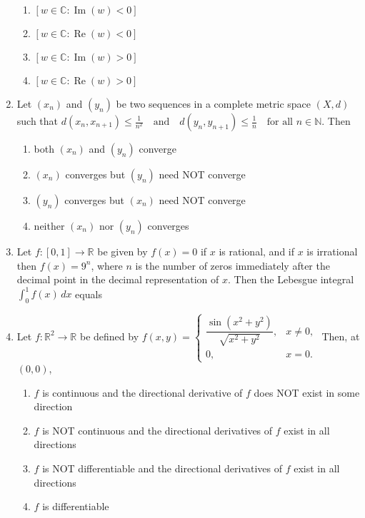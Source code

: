 \documentclass{article}
\newcommand{\brak}[1]{\left( #1 \right)}
\newcommand{\sbrak}[1]{\left[ #1 \right]}
\begin{document}
\begin{enumerate}
\begin{enumerate}
    \item $\sbrak{w \in \mathbb{C} : \operatorname{Im} \brak{w} < 0}$
    \item $\sbrak{w \in \mathbb{C} : \operatorname{Re} \brak{w} < 0}$
    \item $\sbrak{w \in \mathbb{C} : \operatorname{Im} \brak{w} > 0}$
    \item $\sbrak{w \in \mathbb{C} : \operatorname{Re} \brak{w} > 0}$
\end{enumerate}

\item Let $\brak{x_n}$ and $\brak{y_n}$ be two sequences in a complete metric space $\brak{X, d}$ such that 
$d \brak{x_n, x_{n+1}} \leq \frac{1}{n^2} \quad \text{and} \quad d \brak{y_n, y_{n+1}} \leq \frac{1}{n} \quad \text{for all } n \in \mathbb{N}.$
Then

\begin{enumerate}
    \item both $\brak{x_n}$ and $\brak{y_n}$ converge
    \item $\brak{x_n}$ converges but $\brak{y_n}$ need NOT converge
    \item $\brak{y_n}$ converges but $\brak{x_n}$ need NOT converge
    \item neither $\brak{x_n}$ nor $\brak{y_n}$ converges
\end{enumerate}

\item Let $f: \sbrak{0, 1} \to \mathbb{R}$ be given by $f \brak{x} = 0$ if $x$ is rational, and if $x$ is irrational then $f \brak{x} = 9^n$, where $n$ is the number of zeros immediately after the decimal point in the decimal representation of $x$. Then the Lebesgue integral
$\int_0^1 f \brak{x} \, dx$
equals 

\item Let $f: \mathbb{R}^2 \to \mathbb{R}$ be defined by 
$f \brak{x, y} = \begin{cases}
\dfrac{\sin \brak{x^2 + y^2}}{\sqrt{x^2 + y^2}}, & x \neq 0, \\
0, & x = 0.
\end{cases}$
Then, at $\brak{0, 0}$,

\begin{enumerate}
    \item $f$ is continuous and the directional derivative of $f$ does NOT exist in some direction
    \item $f$ is NOT continuous and the directional derivatives of $f$ exist in all directions
    \item $f$ is NOT differentiable and the directional derivatives of $f$ exist in all directions
    \item $f$ is differentiable
\end{enumerate}


\end{enumerate}
\end{document}
